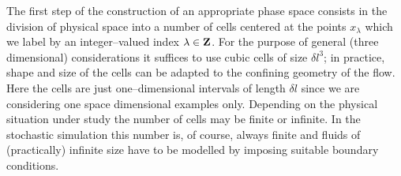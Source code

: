 The first step of the construction of an appropriate phase space
consists
in the division of physical space into a number of cells
centered at the points $x_{\lambda}$ which we
label by an integer--valued index $\lambda \in {\bf{Z}}$.
For the purpose of
general (three dimensional)
considerations it suffices to use cubic cells of size $\delta l^{3}$;
in practice, shape and size of the cells can be adapted to
the confining geometry of the flow. Here the
cells are
just one--dimensional intervals of length $\delta l$ since we are
considering
one space dimensional examples only. Depending on the physical
situation under study the number of cells may be finite or
infinite. In
the stochastic simulation this number is, of course, always finite
and
fluids of (practically) infinite size have to be modelled by
imposing suitable
boundary conditions.

